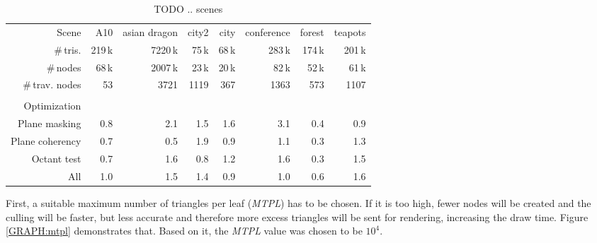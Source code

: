 \documentclass[report,11pt]{elsarticle}
\begin{document}
\begin{table*}[t]
\begin{center}
\begin{tabular}{| r || r | r | r | r | r | r | r |}
	\hline
	Scene                                   & A10 & asian dragon & city2 & city & conference & forest & teapots \\
	\#\,tris.                               & 219\,k & 7220\,k & 75\,k & 68\,k & 283\,k & 174\,k & 201\,k \\
	\#\,nodes                               & 68\,k & 2007\,k & 23\,k & 20\,k & 82\,k & 52\,k & 61\,k \\
	\#\,trav. nodes                         & 53  & 3721 & 1119 & 367 & 1363  & 573 & 1107 \\
	\diagbox[width=10em]{\\Optimization}{} &&&&&&& \\
\hline
\hline
	Plane masking                           & 0.8 & 2.1 & 1.5 & 1.6 & 3.1 & 0.4 & 0.9 \\
\hline
	Plane coherency                         & 0.7 & 0.5 & 1.9 & 0.9 & 1.1 & 0.3 & 1.3 \\
\hline
	Octant test                             & 0.7 & 1.6 & 0.8 & 1.2 & 1.6 & 0.3 & 1.5 \\
\hline
	All                                     & 1.0 & 1.5 & 1.4 & 0.9 & 1.0 & 0.6 & 1.6 \\
\hline
\end{tabular}
\end{center}
	\caption{TODO .. scenes}
	\label{TAB:scenes}
\end{table*}

First, a suitable maximum number of triangles per leaf (\emph{MTPL}) has to be chosen. If it is too high, fewer nodes will be created and the culling will be faster, but less accurate and therefore more excess triangles will be sent for rendering, increasing the draw time. Figure \ref{GRAPH:mtpl} demonstrates that. Based on it, the \emph{MTPL} value was chosen to be $10^{4}$.
\end{document}

